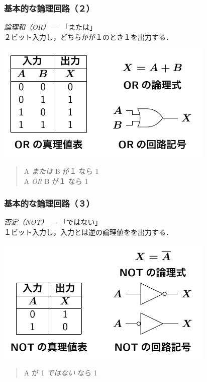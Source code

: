 \documentclass{beamer}                 %
\begin{document}
\begin{frame}
  \frametitle{基本的な論理回路（２）}
  \emph{論理和（OR）} --- 「または」\\
  \vfill
  ２ビット入力し，どちらかが１のとき１を出力する．
  \centerline{\includegraphics[scale=1.4]{../Tikz/or.pdf}}
  \begin{quote}
    A \emph{または} B が１ なら 1\\
    A \emph{OR} B が１ なら 1
  \end{quote}
  \vfill
\end{frame}

\begin{frame}
  \frametitle{基本的な論理回路（３）}
  \emph{否定（NOT）} --- 「ではない」\\
  \vfill
  １ビット入力し，入力とは逆の論理値をを出力する．
  \centerline{\includegraphics[scale=1.4]{../Tikz/not.pdf}}
  \begin{quote}
    A が 1 \emph{ではない} なら 1\\
  \end{quote}
  \vfill
\end{frame}
\end{document}
